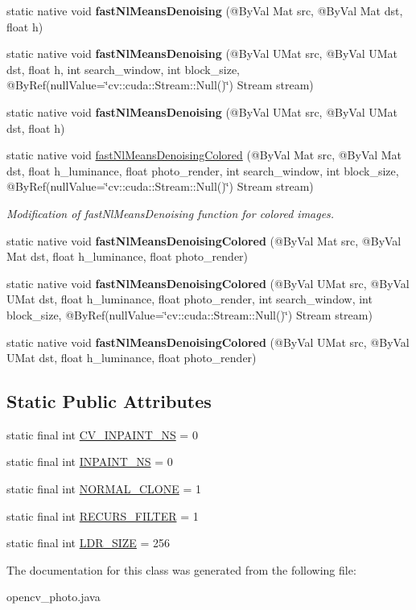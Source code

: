 \begin{DoxyCompactItemize}
static native void {\bfseries fast\+Nl\+Means\+Denoising} (@By\+Val Mat src, @By\+Val Mat dst, float h)
\item 
static native void {\bfseries fast\+Nl\+Means\+Denoising} (@By\+Val U\+Mat src, @By\+Val U\+Mat dst, float h, int search\+\_\+window, int block\+\_\+size, @By\+Ref(null\+Value=\char`\"{}cv\+::cuda\+::\+Stream\+::\+Null()\char`\"{}) Stream stream)
\item 
static native void {\bfseries fast\+Nl\+Means\+Denoising} (@By\+Val U\+Mat src, @By\+Val U\+Mat dst, float h)
\item 
static native void \hyperlink{group__photo__denoise_gacd4a3b55d6d09a6c95d4cc53f633968c}{fast\+Nl\+Means\+Denoising\+Colored} (@By\+Val Mat src, @By\+Val Mat dst, float h\+\_\+luminance, float photo\+\_\+render, int search\+\_\+window, int block\+\_\+size, @By\+Ref(null\+Value=\char`\"{}cv\+::cuda\+::\+Stream\+::\+Null()\char`\"{}) Stream stream)
\begin{DoxyCompactList}\small\item\em Modification of fast\+Nl\+Means\+Denoising function for colored images. \end{DoxyCompactList}\item 
static native void {\bfseries fast\+Nl\+Means\+Denoising\+Colored} (@By\+Val Mat src, @By\+Val Mat dst, float h\+\_\+luminance, float photo\+\_\+render)
\item 
static native void {\bfseries fast\+Nl\+Means\+Denoising\+Colored} (@By\+Val U\+Mat src, @By\+Val U\+Mat dst, float h\+\_\+luminance, float photo\+\_\+render, int search\+\_\+window, int block\+\_\+size, @By\+Ref(null\+Value=\char`\"{}cv\+::cuda\+::\+Stream\+::\+Null()\char`\"{}) Stream stream)
\item 
static native void {\bfseries fast\+Nl\+Means\+Denoising\+Colored} (@By\+Val U\+Mat src, @By\+Val U\+Mat dst, float h\+\_\+luminance, float photo\+\_\+render)
\end{DoxyCompactItemize}
\subsection*{Static Public Attributes}
\begin{DoxyCompactItemize}
\item 
static final int \hyperlink{group__photo__c_ga4a11abb5c18d99ce04f11105b1447eda}{C\+V\+\_\+\+I\+N\+P\+A\+I\+N\+T\+\_\+\+NS} = 0
\item 
static final int \hyperlink{group__photo_ga81c9fcd4663cdb43a1f8d9a782e57903}{I\+N\+P\+A\+I\+N\+T\+\_\+\+NS} = 0
\item 
static final int \hyperlink{group__photo_ga4e82340ea44373f9457dac4bd64bbf85}{N\+O\+R\+M\+A\+L\+\_\+\+C\+L\+O\+NE} = 1
\item 
static final int \hyperlink{group__photo_ga560c840660db719eb465b520ad603a00}{R\+E\+C\+U\+R\+S\+\_\+\+F\+I\+L\+T\+ER} = 1
\item 
static final int \hyperlink{group__photo__hdr_ga98c440e0fd8daec10e153e462ade0b28}{L\+D\+R\+\_\+\+S\+I\+ZE} = 256
\end{DoxyCompactItemize}


The documentation for this class was generated from the following file\+:\begin{DoxyCompactItemize}
\item 
opencv\+\_\+photo.\+java\end{DoxyCompactItemize}
